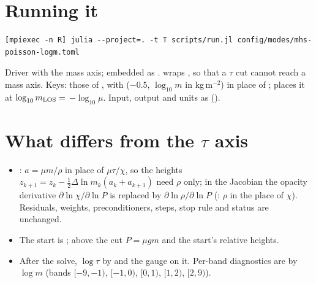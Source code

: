 


\section{Running it}
{\footnotesize\begin{verbatim}
[mpiexec -n R] julia --project=. -t T scripts/run.jl config/modes/mhs-poisson-logm.toml
\end{verbatim}}
Driver  with the mass axis; embedded as .  wraps , so that a
$\tau$ cut cannot reach a mass axis. Keys: those of , with  ($-0.5$, $\log_{10}m$ in
kg\,m$^{-2}$) in place of ;  places it at $\log_{10}m_{\rm LOS}=$ 
$-\log_{10}\mu$. Input, output and units as  ().

\section{What differs from the $\tau$ axis}
\begin{itemize}
\item {}: $a=\mu m/\rho$ in place of $\mu\tau/\chi$, so the heights $z_{k+1}=z_k-\tfrac12\Delta\ln m_k(a_k+a_{k+1})$
need $\rho$ only; in the Jacobian the opacity derivative $\partial\ln\chi/\partial\ln P$ is replaced by $\partial\ln\rho/\partial\ln P$
(: $\rho$ in the place of $\chi$). Residuals, weights, preconditioners, steps, stop rule and status are unchanged.
\item The start is ; above the cut $P=\mu gm$ and the start's relative heights.
\item After the solve, $\log\tau$ by  and the gauge on it. Per-band diagnostics are by $\log m$
(bands $[-9,-1)$, $[-1,0)$, $[0,1)$, $[1,2)$, $[2,9)$).
\end{itemize}




